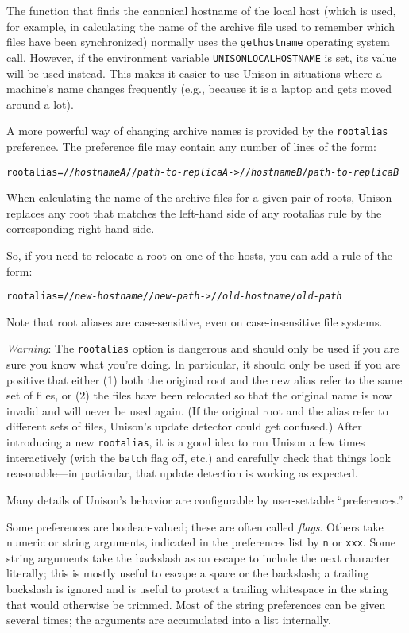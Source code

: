 \documentclass{article}
\newcommand{\NT}[1]{\textit{#1}}
\begin{document}
The function that finds the canonical hostname of the local host (which
is used, for example, in calculating the name of the archive file used to
remember which files have been synchronized) normally uses the
\verb|gethostname| operating system call.  However, if the environment
variable \verb|UNISONLOCALHOSTNAME| is set, its value will be used
instead.  This makes it easier to use Unison in situations where a
machine's name changes frequently (e.g., because it is a laptop and gets
moved around a lot).

A more powerful way of changing archive names is provided by the
\verb|rootalias| preference.  The preference file may contain any number of
lines of the form:
\begin{alltt}
    rootalias = //\NT{hostnameA}//\NT{path-to-replicaA} -> //\NT{hostnameB}/\NT{path-to-replicaB}
\end{alltt}
When calculating the name of the archive files for a given pair of roots,
Unison replaces any root that matches the left-hand side of any rootalias
rule by the corresponding right-hand side.

So, if you need to relocate a root on one of the hosts, you can add a
rule of the form:
\begin{alltt}
    rootalias = //\NT{new-hostname}//\NT{new-path} -> //\NT{old-hostname}/\NT{old-path}
\end{alltt}
Note that root aliases are case-sensitive, even on case-insensitive file
systems.

{\em Warning}: The \verb|rootalias| option is dangerous and should only
be used if you are sure you know what you're doing.  In particular, it
should only be used if you are positive that either (1) both the original
root and the new alias refer to the same set of files, or (2) the files
have been relocated so that the original name is now invalid and will
never be used again.  (If the original root and the alias refer to
different sets of files, Unison's update detector could get confused.)
%
After introducing a new \verb|rootalias|, it is a good idea to run Unison
a few times interactively (with the \verb|batch| flag off, etc.) and
carefully check that things look reasonable---in particular, that update
detection is working as expected.



Many details of Unison's behavior are configurable by user-settable
``preferences.''

Some preferences are boolean-valued; these are often called {\em flags}.
Others take numeric or string arguments, indicated in the preferences
list by {\tt n} or {\tt xxx}.  Some string arguments take the backslash as
an escape to include the next character literally; this is mostly useful
to escape a space or the backslash; a trailing backslash is ignored and is
useful to protect a trailing whitespace in the string that would otherwise
be trimmed.  Most of the string preferences can be given several times;
the arguments are accumulated into a list internally.
\end{document}
